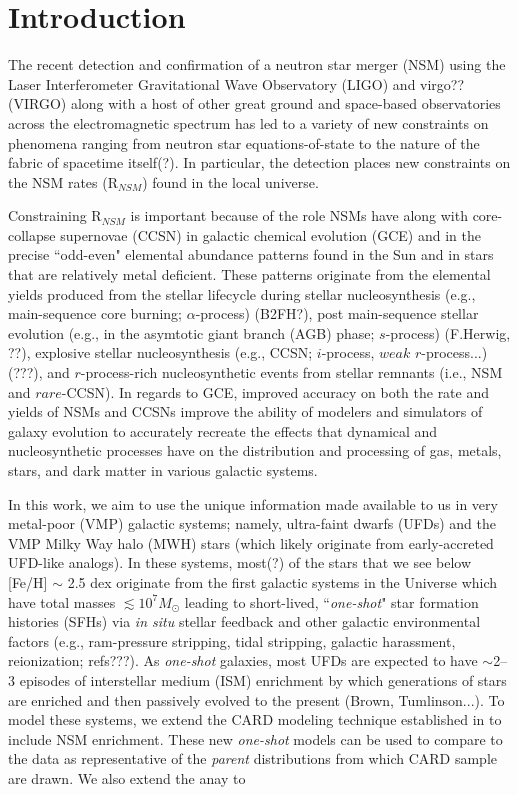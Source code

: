 \section{Introduction}
\label{intro} 
The recent detection and confirmation of a neutron star merger (NSM) using the Laser Interferometer Gravitational Wave Observatory (LIGO) and virgo?? (VIRGO) along with a host of other great ground and space-based observatories across the electromagnetic spectrum has led to a variety of new constraints on phenomena ranging from neutron star equations-of-state to the nature of the fabric of spacetime itself(?). In particular, the detection places new constraints on the NSM rates (R$_{NSM}$) found in the local universe. 

Constraining R$_{NSM}$ is important because of the role NSMs have along with core-collapse supernovae (CCSN) in galactic chemical evolution (GCE) and in the precise ``odd-even" elemental abundance patterns found in the Sun and in stars that are relatively metal deficient. These patterns originate from the elemental yields produced from the stellar lifecycle during stellar nucleosynthesis (e.g., main-sequence core burning; $\alpha$-process) (B2FH?), post main-sequence stellar evolution (e.g., in the asymtotic giant branch (AGB) phase; $s$-process) (F.Herwig, ??), explosive stellar nucleosynthesis (e.g., CCSN; $i$-process, $weak$ $r$-process...) (???), and $r$-process-rich nucleosynthetic events from stellar remnants (i.e., NSM and $rare$-CCSN). In regards to GCE, improved accuracy on both the rate and yields of NSMs and CCSNs improve the ability of modelers and simulators of galaxy evolution to accurately recreate the effects that dynamical and nucleosynthetic processes have on the distribution and processing of gas, metals, stars, and dark matter in various galactic systems.

In this work, we aim to use the unique information made available to us in very metal-poor (VMP) galactic systems; namely, ultra-faint dwarfs (UFDs) and the VMP Milky Way halo (MWH) stars (which likely originate from early-accreted UFD-like analogs). In these systems, most(?) of the stars that we see below [Fe/H] $\sim$ 2.5 dex originate from the first galactic systems in the Universe which have total masses $\lesssim10^7 M_\odot$ leading to short-lived, ``{\it one-shot}" star formation histories (SFHs) via {\it in situ} stellar feedback and other galactic environmental factors (e.g., ram-pressure stripping, tidal stripping, galactic harassment, reionization; refs???). As {\it one-shot} galaxies, most UFDs are expected to have $\sim$2--3 episodes of interstellar medium (ISM) enrichment by which generations of stars are enriched and then passively evolved to the present (Brown, Tumlinson...). To model these systems, we extend the CARD modeling technique established in \cite{Lee_2013} to include NSM enrichment. These new {\it one-shot} models can be used to compare to the data as representative of the {\it parent} distributions from which CARD sample are drawn. We also extend the \cite{Lee_2013} anay to 



